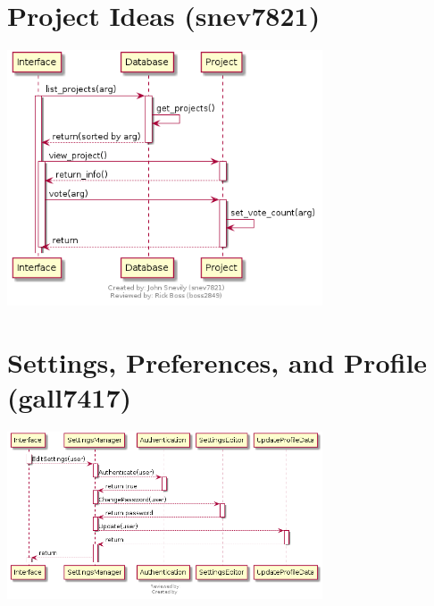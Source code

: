 \documentclass[11pt]{report}
\begin{document}
\section{Project Ideas (snev7821)}
    \begin{minipage}{1\textwidth}
        \begin{center}
            \includegraphics[width=0.7\textwidth]{diagrams/sequence-projectideas}
        \end{center}
    \end{minipage}
    
\section{Settings, Preferences, and Profile (gall7417)}
    \begin{minipage}{1\textwidth}
        \begin{center}
            \includegraphics[width=0.7\textwidth]{diagrams/SettingsSequenceDiagram}
        \end{center}
    \end{minipage}
    
\end{document}
